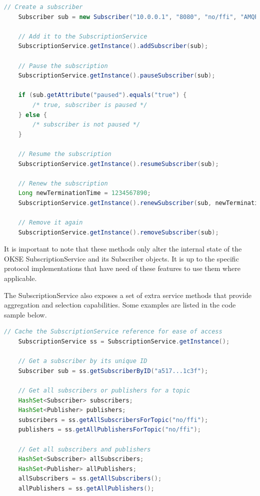 \begin{lstlisting}[language=Java, captionpos=b, caption=Subscriber actions, frame=bt, showstringspaces=false]
    // Create a subscriber
    Subscriber sub = new Subscriber("10.0.0.1", "8080", "no/ffi", "AMQP");
    
    // Add it to the SubscriptionService
    SubscriptionService.getInstance().addSubscriber(sub);
    
    // Pause the subscription
    SubscriptionService.getInstance().pauseSubscriber(sub);
    
    if (sub.getAttribute("paused").equals("true") {
        /* true, subscriber is paused */
    } else {
        /* subscriber is not paused */
    }
    
    // Resume the subscription
    SubscriptionService.getInstance().resumeSubscriber(sub);
    
    // Renew the subscription
    Long newTerminationTime = 1234567890;
    SubscriptionService.getInstance().renewSubscriber(sub, newTerminationTime);
    
    // Remove it again
    SubscriptionService.getInstance().removeSubscriber(sub);
\end{lstlisting}

It is important to note that these methods only alter the internal state of the OKSE SubscriptionService and its Subscriber objects. It is up to the specific protocol implementations that have need of these features to use them where applicable.

The SubscriptionService also exposes a set of extra service methods that provide aggregation and selection capabilities. Some examples are listed in the code sample below.

\begin{lstlisting}[language=Java, captionpos=b, caption=Additional SubscriptionService methods, frame=bt, showstringspaces=false]
    // Cache the SubscriptionService reference for ease of access
    SubscriptionService ss = SubscriptionService.getInstance();
    
    // Get a subscriber by its unique ID
    Subscriber sub = ss.getSubscriberByID("a517...1c3f");
    
    // Get all subscribers or publishers for a topic
    HashSet<Subscriber> subscribers;
    HashSet<Publisher> publishers;
    subscribers = ss.getAllSubscribersForTopic("no/ffi");
    publishers = ss.getAllPublishersForTopic("no/ffi");
    
    // Get all subscribers and publishers
    HashSet<Subscriber> allSubscribers;
    HashSet<Publisher> allPublishers;
    allSubscribers = ss.getAllSubscribers();
    allPublishers = ss.getAllPublishers();
\end{lstlisting}

